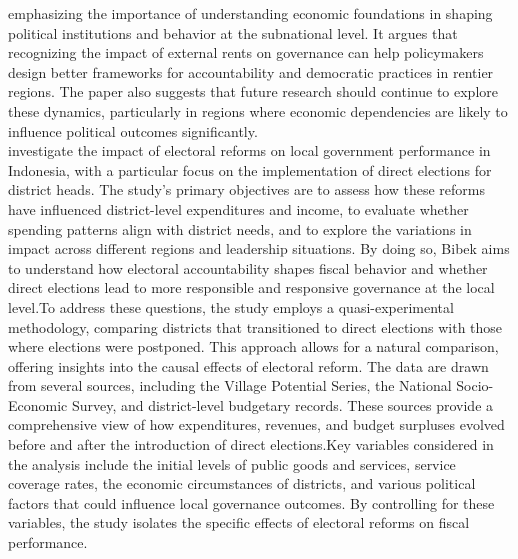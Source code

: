 emphasizing the importance of understanding economic foundations in shaping political institutions and behavior at the subnational level. It argues that recognizing the impact of external rents on governance can help policymakers design better frameworks for accountability and democratic practices in rentier regions. The paper also suggests that future research should continue to explore these dynamics, particularly in regions where economic dependencies are likely to influence political outcomes significantly.  \\
  investigate the impact of electoral reforms on local government performance in Indonesia, with a particular focus on the implementation of direct elections for district heads. The study's primary objectives are to assess how these reforms have influenced district-level expenditures and income, to evaluate whether spending patterns align with district needs, and to explore the variations in impact across different regions and leadership situations. By doing so, Bibek aims to understand how electoral accountability shapes fiscal behavior and whether direct elections lead to more responsible and responsive governance at the local level.To address these questions, the study employs a quasi-experimental methodology, comparing districts that transitioned to direct elections with those where elections were postponed. This approach allows for a natural comparison, offering insights into the causal effects of electoral reform. The data are drawn from several sources, including the Village Potential Series, the National Socio-Economic Survey, and district-level budgetary records. These sources provide a comprehensive view of how expenditures, revenues, and budget surpluses evolved before and after the introduction of direct elections.Key variables considered in the analysis include the initial levels of public goods and services, service coverage rates, the economic circumstances of districts, and various political factors that could influence local governance outcomes. By controlling for these variables, the study isolates the specific effects of electoral reforms on fiscal performance.
